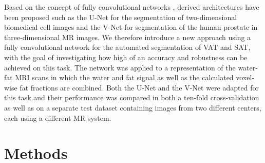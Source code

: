 \documentclass[10pt,letterpaper]{article}
\begin{document}
	\iffalse
	Rather than relying on techniques such as clustering, thresholding and registration, the most successful methods for image-based semantic segmentation on current benchmark datasets in the computer vision community employ machine learning strategies such as convolutional neural networks \cite{everingham2015pascal}, \cite{garcia2017review}, \cite{lecun2015deep}, which have also seen success in medical applications \cite{shen2017deep}. Based on the concept of fully convolutional networks \cite{long2015fully}, derived architectures have been proposed such as the U-Net \cite{ronneberger2015u} for the segmentation of two-dimensional biomedical cell images and the V-Net \cite{milletari2016v} for segmentation of the human prostate in three-dimensional MR images. 
	We therefore introduce a new approach using a fully convolutional network for the automated segmentation of VAT and SAT, with the goal of investigating how high of an accuracy and robustness can be achieved on this task. The network was applied to a representation of the water-fat MRI scans in which the water and fat signal as well as the calculated voxel-wise fat fractions are combined. Both the U-Net and the V-Net were adapted for this task and their performance was compared in both a ten-fold cross-validation as well as on a separate test dataset containing images from two different centers, each using a different MR system.
	\fi
	
	Based on the concept of fully convolutional networks \cite{long2015fully}, derived architectures have been proposed such as the U-Net \cite{ronneberger2015u} for the segmentation of two-dimensional biomedical cell images and the V-Net \cite{milletari2016v} for segmentation of the human prostate in three-dimensional MR images. 
	We therefore introduce a new approach using a fully convolutional network for the automated segmentation of VAT and SAT, with the goal of investigating how high of an accuracy and robustness can be achieved on this task. The network was applied to a representation of the water-fat MRI scans in which the water and fat signal as well as the calculated voxel-wise fat fractions are combined. Both the U-Net and the V-Net were adapted for this task and their performance was compared in both a ten-fold cross-validation as well as on a separate test dataset containing images from two different centers, each using a different MR system.
	
	
	
	
	\section*{Methods}
	
\end{document}
